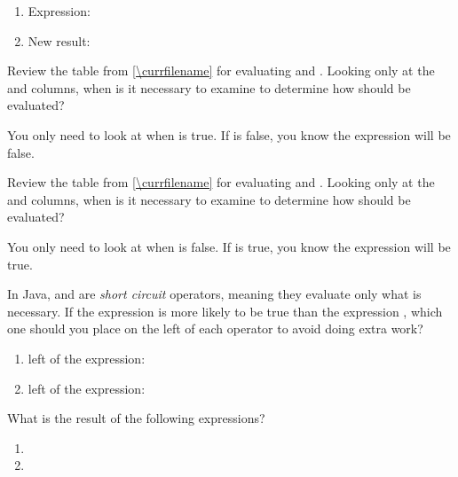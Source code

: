 \begin{enumerate}
\item Expression: 
\item New result: 
\end{enumerate}


\Q Review the table from \ref{\currfilename} for evaluating \java{&&} and \java{||}.
Looking only at the  and \java{&&} columns, when is it necessary to examine  to determine how  should be evaluated?

\begin{answer}
You only need to look at  when  is true.
If  is false, you know the expression will be false.
\end{answer}


\Q Review the table from \ref{\currfilename} for evaluating \java{&&} and \java{||}.
Looking only at the  and \java{||} columns, when is it necessary to examine  to determine how  should be evaluated?

\begin{answer}
You only need to look at  when  is false.
If  is true, you know the expression will be true.
\end{answer}


\Q \label{key3}
In Java, \java{&&} and \java{||} are \emph{short circuit} operators, meaning they evaluate only what is necessary.
If the expression  is more likely to be true than the expression , which one should you place on the left of each operator to avoid doing extra work?

\begin{enumerate}
\item left of the \java{&&} expression:
\item left of the \java{||} expression:
\end{enumerate}


\Q What is the result of the following expressions?
\begin{enumerate}
\item {}
\item {}
\end{enumerate}
